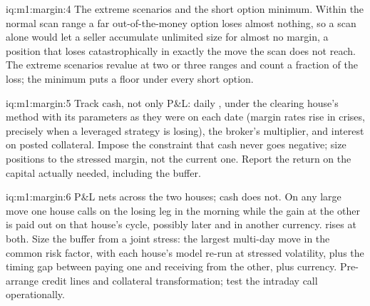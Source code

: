 \begin{solution}{iq:m1:margin:4}
The extreme scenarios and the short option minimum. Within the normal scan
range a far out-of-the-money option loses almost nothing, so a scan alone
would let a seller accumulate unlimited size for almost no margin, a
position that loses catastrophically in exactly the move the scan does not
reach. The extreme scenarios revalue at two or three ranges and count a
fraction of the loss; the minimum puts a floor under every short option.
\end{solution}

\begin{solution}{iq:m1:margin:5}
Track cash, not only P\&L: daily ,  under the
clearing house's method with its parameters as they were on each date
(margin rates rise in crises, precisely when a leveraged strategy is
losing), the broker's multiplier, and interest on posted collateral. Impose
the constraint that cash never goes negative; size positions to the stressed
margin, not the current one. Report the return on the capital actually
needed, including the buffer.
\end{solution}

\begin{solution}{iq:m1:margin:6}
P\&L nets across the two houses; cash does not. On any large move one house
calls  on the losing leg in the morning while the gain at
the other is paid out on that house's cycle, possibly later and in another
currency.  rises at both. Size the buffer from a joint stress:
the largest multi-day move in the common risk factor, with each house's
model re-run at stressed volatility, plus the timing gap between paying one
and receiving from the other, plus currency. Pre-arrange credit lines and
collateral transformation; test the intraday call operationally.
\end{solution}
